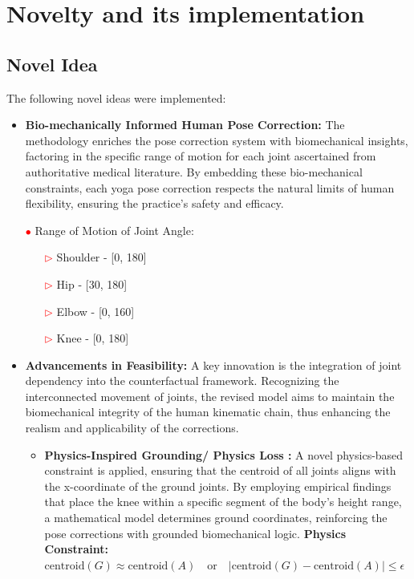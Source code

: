\begin{itemize}
\end{itemize}

\section{Novelty and its implementation}
\subsection{Novel Idea}
The following novel ideas were implemented:
\begin{itemize}
    \item \textbf{Bio-mechanically Informed Human Pose Correction:}
    The methodology enriches the pose correction system with biomechanical insights, factoring in the specific range of motion for each joint ascertained from authoritative medical literature. By embedding these bio-mechanical constraints, each yoga pose correction respects the natural limits of human flexibility, ensuring the practice's safety and efficacy.
    \item[\textcolor{red}{$\bullet$}] Range of Motion of Joint Angle:
    \begin{itemize}
        \item[\textcolor{red}{$\triangleright$}] Shoulder - [0, 180]
        \item[\textcolor{red}{$\triangleright$}] Hip - [30, 180]
        \item[\textcolor{red}{$\triangleright$}] Elbow - [0, 160]
        \item[\textcolor{red}{$\triangleright$}] Knee - [0, 180]
    \end{itemize}
    \item \textbf{Advancements in Feasibility:}
    A key innovation is the integration of joint dependency into the counterfactual framework. Recognizing the interconnected movement of joints, the revised model aims to maintain the biomechanical integrity of the human kinematic chain, thus enhancing the realism and applicability of the corrections.
    \begin{itemize}
        \item \textbf{Physics-Inspired Grounding/ Physics Loss :}
        A novel physics-based constraint is applied, ensuring that the centroid of all joints aligns with the x-coordinate of the ground joints. By employing empirical findings that place the knee within a specific segment of the body's height range, a mathematical model determines ground coordinates, reinforcing the pose corrections with grounded biomechanical logic. \newline \newline
        \textbf{Physics Constraint:} $\boxed{\text{centroid}(G) \approx \text{centroid}(A) \quad \text{or} \quad |\text{centroid}(G) - \text{centroid}(A)| \leq \epsilon}$


\end{itemize}
\end{itemize}
